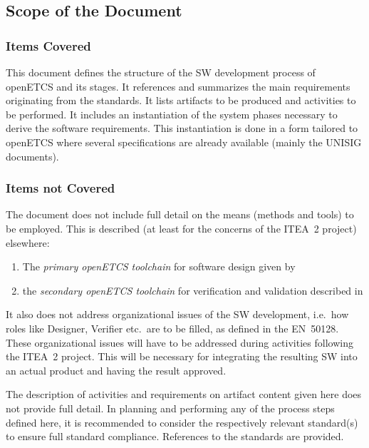 \documentclass{template/openetcs_article}
\begin{document}
\subsection{Scope of the Document}
\label{sec:scope-document}

\subsubsection{Items Covered}
\label{sec:items-covered}

This document defines the structure of the SW development process of
openETCS and its stages. It references and summarizes the main
requirements originating from the standards. It lists artifacts to be
produced and activities to be performed. It includes an instantiation
of the system phases necessary to derive the software
requirements. This instantiation is done in a form tailored to
openETCS where several specifications are already available (mainly
the UNISIG documents). 


\subsubsection{Items not Covered}
\label{sec:items-not-covered}


The document does not include full detail on the means (methods and
tools) to be employed. This is described (at least for the concerns of
the ITEA~2 project) elsewhere:
\begin{enumerate}
\item The \emph{primary openETCS toolchain} for software design given
  by \cite{openETCS:D7.1} 
\item the \emph{secondary openETCS toolchain} for verification and
  validation described in \cite{openETCS:D4.1.1.2}
\end{enumerate}
%
It also does not address organizational issues of the SW development,
i.e.\ how roles like Designer, Verifier etc.\ are to be filled, as
defined in the EN~50128.  These organizational issues will have to be
addressed during activities following the ITEA~2 project. This will be
necessary for integrating the resulting SW into an actual product and
having the result approved.

The description of activities and requirements on artifact content
given here does not provide full detail. In planning and performing
any of the process steps defined here, it is recommended to consider
the respectively relevant standard(s) to ensure full standard
compliance. References to the standards are provided.
\end{document}

